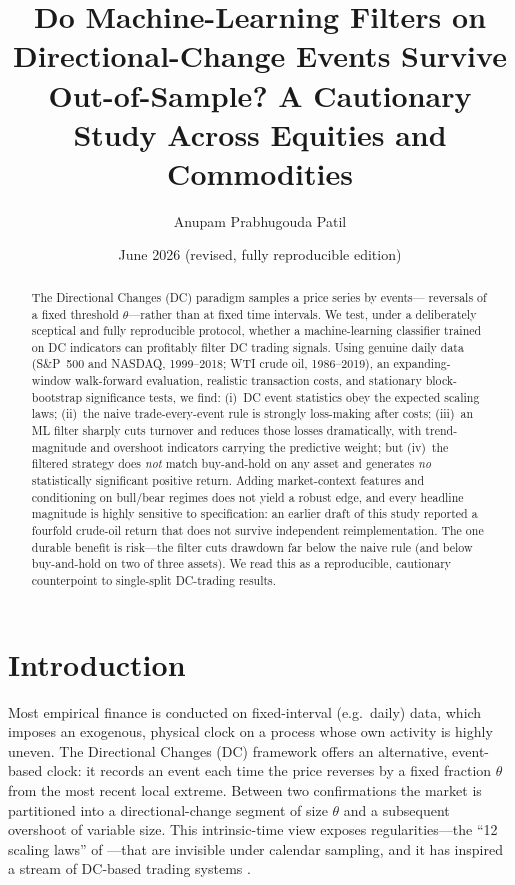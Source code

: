 \documentclass[11pt]{article}
\title{\bfseries Do Machine-Learning Filters on Directional-Change Events
Survive Out-of-Sample? A Cautionary Study Across Equities and Commodities}
\author{Anupam Prabhugouda Patil}
\date{June 2026 \quad (revised, fully reproducible edition)}
\begin{document}
\maketitle

\begin{abstract}
The Directional Changes (DC) paradigm samples a price series by events---%
reversals of a fixed threshold $\theta$---rather than at fixed time intervals.
We test, under a deliberately sceptical and fully reproducible protocol, whether
a machine-learning classifier trained on DC indicators can profitably filter DC
trading signals. Using genuine daily data (S\&P~500 and NASDAQ, 1999--2018; WTI
crude oil, 1986--2019), an expanding-window walk-forward evaluation, realistic
transaction costs, and stationary block-bootstrap significance tests, we find:
(i)~DC event statistics obey the expected scaling laws; (ii)~the naive
trade-every-event rule is strongly loss-making after costs; (iii)~an ML filter
sharply cuts turnover and reduces those losses dramatically, with
trend-magnitude and overshoot indicators carrying the predictive weight; but
(iv)~the filtered strategy does \emph{not} match buy-and-hold on any asset and
generates \emph{no} statistically significant positive return. Adding
market-context features and conditioning on bull/bear regimes does not yield a
robust edge, and every headline magnitude is highly sensitive to specification:
an earlier draft of this study reported a fourfold crude-oil return that does
not survive independent reimplementation. The one durable benefit is risk---the
filter cuts drawdown far below the naive rule (and below buy-and-hold on two of
three assets). We read this as a reproducible, cautionary counterpoint to
single-split DC-trading results.
\end{abstract}

\section{Introduction}
Most empirical finance is conducted on fixed-interval (e.g.\ daily) data, which
imposes an exogenous, physical clock on a process whose own activity is highly
uneven. The Directional Changes (DC) framework \citep{guillaume1997,tsang2010}
offers an alternative, event-based clock: it records an event each time the
price reverses by a fixed fraction $\theta$ from the most recent local extreme.
Between two confirmations the market is partitioned into a directional-change
segment of size $\theta$ and a subsequent overshoot of variable size. This
intrinsic-time view exposes regularities---the ``12 scaling laws'' of
\citet{glattfelder2011}---that are invisible under calendar sampling, and it has
inspired a stream of DC-based trading systems \citep{aloud2012,kampouridis2017,
bakhach2018}.
\end{document}
